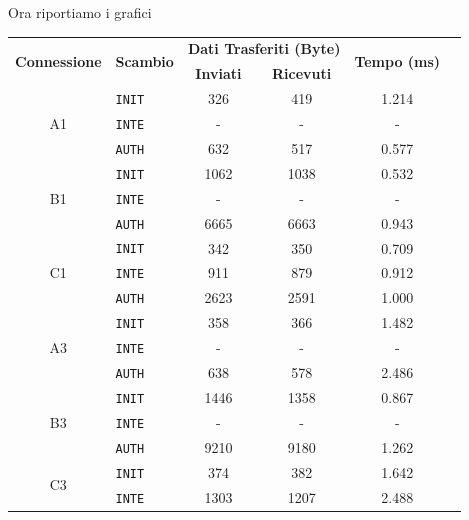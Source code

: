 Ora riportiamo i grafici


\newpage

\begin{table}[h!] 
    \centering 
    \begin{tabular}{clcccc} 
        \toprule
        \multirow{2}{*}{\textbf{Connessione}} & \multirow{2}{*}{\textbf{Scambio}} & \multicolumn{2}{c}{\textbf{Dati Trasferiti (Byte)}} & \multirow{2}{*}{\textbf{Tempo (ms)}} \\
        \cline{3-4} & & \textbf{Inviati} & \textbf{Ricevuti} \\
        \toprule
        \multirow{3}{*}{A1} & \texttt{INIT} & 326 & 419 & 1.214 \\ 
                            & \texttt{INTE} & - & - & - \\
                            & \texttt{AUTH} &  632 & 517 & 0.577 \\ 
        \hline
        \multirow{3}{*}{B1} & \texttt{INIT} & 1062 & 1038 & 0.532 \\ 
                            & \texttt{INTE} & - & - & - \\
                            & \texttt{AUTH} & 6665 & 6663 & 0.943 \\ 
        \hline
        \multirow{3}{*}{C1} & \texttt{INIT} & 342 & 350 & 0.709 \\ 
                            & \texttt{INTE} & 911 & 879 & 0.912 \\
                            & \texttt{AUTH} & 2623 & 2591 & 1.000 \\ 
        \hline
        \multirow{3}{*}{A3} & \texttt{INIT} & 358 & 366 & 1.482 \\ 
                            & \texttt{INTE} & - & - & - \\
                            & \texttt{AUTH} & 638 & 578 & 2.486 \\ 
        \hline
        \multirow{3}{*}{B3} & \texttt{INIT} & 1446 & 1358 & 0.867 \\ 
                            & \texttt{INTE} & - & - & - \\
                            & \texttt{AUTH} & 9210 & 9180 & 1.262 \\ 
        \hline
        \multirow{3}{*}{C3} & \texttt{INIT} & 374 & 382 & 1.642 \\ 
                            & \texttt{INTE} & 1303 & 1207 & 2.488 \\

\end{tabular}
\end{table}
